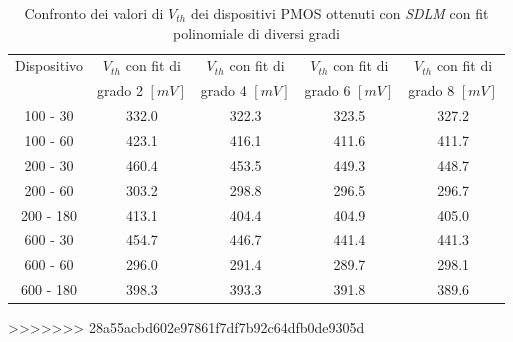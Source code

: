 \documentclass[12pt, letterpaper]{book}
\begin{document}
\begin{table}[htp]
  \renewcommand{\arraystretch}{1.3}
  \caption{Confronto dei valori di $V_{th}$ dei dispositivi PMOS ottenuti con \emph{SDLM} con fit polinomiale di diversi gradi}
  \label{tab:GradiSDLM}
  \begin{center}
    \begin{tabular}{c c c c c}
      \hline
      Dispositivo & $V_{th}$  con fit di & $V_{th}$  con fit di & $V_{th}$  con fit di & $V_{th}$  con fit di \\
                  & grado 2 $[mV]$       & grado 4 $[mV]$       & grado 6 $[mV]$       & grado 8 $[mV]$       \\
      \hline
      100 - 30    & 332.0                & 322.3                & 323.5                & 327.2                \\
      \hline
      100 - 60    & 423.1                & 416.1                & 411.6                & 411.7                \\
      \hline
      200 - 30    & 460.4                & 453.5                & 449.3                & 448.7                \\
      \hline
      200 - 60    & 303.2                & 298.8                & 296.5                & 296.7                \\
      \hline
      200 - 180   & 413.1                & 404.4                & 404.9                & 405.0                \\
      \hline
      600 - 30    & 454.7                & 446.7                & 441.4                & 441.3                \\
      \hline
      600 - 60    & 296.0                & 291.4                & 289.7                & 298.1                \\
      \hline
      600 - 180   & 398.3                & 393.3                & 391.8                & 389.6                \\
      \hline
    \end{tabular}
  \end{center}
\end{table}
>>>>>>> 28a55acbd602e97861f7df7b92c64dfb0de9305d
\end{document}
